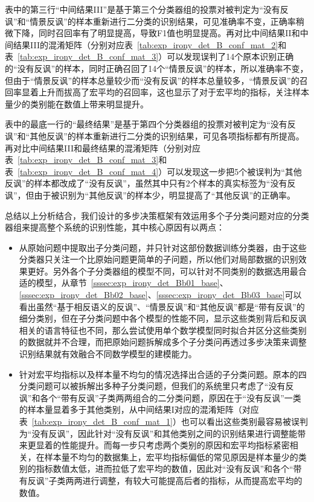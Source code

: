 表中的第三行“中间结果III”是基于第三个分类器组的投票对被判定为“没有反讽”和“情景反讽”的样本重新进行二分类的识别结果，可见准确率不变，正确率稍微下降，同时召回率有了明显提高，导致F1值也明显提高。再对比中间结果II和中间结果III的混淆矩阵（分别对应表~\ref{tab:exp_irony_det_B_conf_mat_2}和表~\ref{tab:exp_irony_det_B_conf_mat_3}）可以发现误判了14个原本识别正确的“没有反讽”的样本，同时正确召回了14个“情景反讽”的样本，所以准确率不变，但由于“情景反讽”的样本总量较少而“没有反讽”的样本总量较多，“情景反讽”的召回率显着上升而拔高了宏平均的召回率，这也显示了对于宏平均的指标，关注样本量少的类别能在数值上带来明显提升。

表中的最底一行的“最终结果”是基于第四个分类器组的投票对被判定为“没有反讽”和“其他反讽”的样本重新进行二分类的识别结果，可见各项指标都有所提高。再对比中间结果III和最终结果的混淆矩阵（分别对应表~\ref{tab:exp_irony_det_B_conf_mat_3}和表~\ref{tab:exp_irony_det_B_conf_mat_4}）可以发现这一步把5个被误判为“其他反讽”的样本都改成了“没有反讽”，虽然其中只有2个样本的真实标签为“没有反讽”，但由于被识别为“其他反讽”的样本少，明显提高了“其他反讽”的正确率。

总结以上分析结合，我们设计的多步决策框架有效运用多个子分类问题对应的分类器组来提高整个系统的识别性能，其中核心原因有以两点：

\begin{itemize}

\item 从原始问题中提取出子分类问题，并只针对这部份数据训练分类器，由于这些分类器只关注一个比原始问题更简单的子问题，所以他们对局部数据的识别效果更好。另外各个子分类器组的模型不同，可以针对不同类别的数据选用最合适的模型，从章节~\ref{sssec:exp_irony_det_Bb01_base}、\ref{sssec:exp_irony_det_Bb02_base}、\ref{sssec:exp_irony_det_Bb03_base}可以看出虽然“基于相反语义的反讽”、“情景反讽”和“其他反讽”都是“带有反讽”的细分类别，但在子分类问题中各个模型的性能不同，显示这些类别背后和反讽相关的语言特征也不同，那么尝试使用单个数学模型同时拟合并区分这些类别的数据就并不合理，而把原始问题拆解成多个子分类问再透过多步决策来调整识别结果就有效融合不同数学模型的建模能力。

\item 针对宏平均指标以及样本量不均匀的情况选择出合适的子分类问题。原本的四分类问题可以被拆解出多种子分类问题，但我们的系统里只考虑了“没有反讽”和各个“带有反讽”子类两两组合的二分类问题，原因在于“没有反讽”一类的样本量显着多于其他类别，从中间结果I对应的混淆矩阵（对应表~\ref{tab:exp_irony_det_B_conf_mat_1}）也可以看出这些类别最容易被误判为“没有反讽”，因此针对“没有反讽”和其他类别之间的识别结果进行调整能带来更显着的性能提升。而每一步只考虑两个类别的原因和宏平均指标紧密相关，在样本量不均匀的数据集上，宏平均指标偏低的常见原因是样本量少的类别的指标数值太低，进而拉低了宏平均的数值，因此对“没有反讽”和各个“带有反讽”子类两两进行调整，有较大可能提高后者的指标，从而提高宏平均的数值。

\end{itemize}

